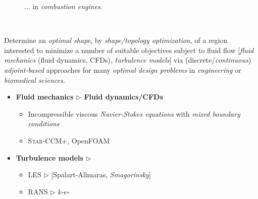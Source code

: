 \documentclass[english,aspectratio=169]{beamer}
\begin{document}
\begin{frame}
\begin{minipage}{0.49\linewidth}
\begin{minipage}{0.45\linewidth}
\begin{figure}
          \vspace{-0.3cm}
          \caption{\footnotesize{$\ldots$ in \textcolor{wiasblue}{\emph{combustion engines}}.}}
      \end{figure}
    \end{minipage}~
    \begin{minipage}{0.72\linewidth}
      \vspace{-0.2cm}
      Determine an \emph{optimal shape}, by \textcolor{wiasblue}{\emph{shape/topology optimization}}, of a region interested to minimize a number of suitable objectives subject to fluid flow [\textcolor{wiasblue}{\emph{fluid mechanics}} (\textcolor{wiasblue}{fluid dynamics, CFDs}), \textcolor{wiasblue}{\emph{turbulence models}}] via (discrete/\emph{continuous}) \textcolor{wiasblue}{\emph{adjoint-based}} approaches for many \textcolor{wiasblue}{\emph{optimal design problems}} in \textcolor{wiasblue}{\emph{engineering}} or \textcolor{wiasblue}{\emph{biomedical sciences}}.
    \end{minipage}
  \end{minipage}\hfill
  \begin{minipage}{0.4\linewidth}
    \begin{itemize}
    \item \textbf{\textcolor{wiasblue}{Fluid mechanics $\triangleright$ Fluid dynamics/CFDs}}\\
    \begin{itemize}
    \item Incompressible viscous \textcolor{wiasblue}{\emph{Navier-Stokes equations}} with \textcolor{wiasblue}{\emph{mixed boundary conditions}}
    \item \textsc{Star-CCM+}, OpenFOAM
    \end{itemize}
    \end{itemize}
    \vspace{-0.2cm}
    \begin{itemize}
    \item \textbf{\textcolor{wiasblue}{Turbulence models} $\triangleright$}
      \begin{itemize}
      \item \textcolor{wiasblue}{LES} $\triangleright$ [Spalart-Allmaras, \textcolor{wiasblue}{\emph{Smagorinsky}}]
      \item \textcolor{wiasblue}{RANS} $\triangleright$ \textcolor{wiasblue}{ $k$-$\epsilon$}\hfill$\square$
      \end{itemize}
    \end{itemize}
  \end{minipage}
\end{frame}
\end{document}
